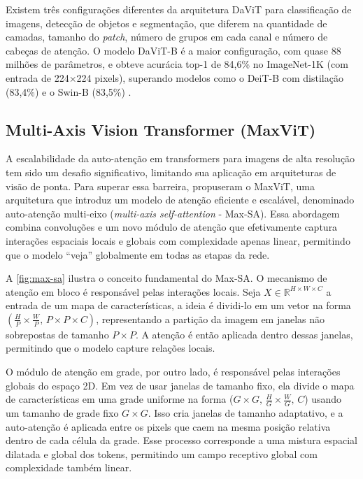 Existem três configurações diferentes da arquitetura DaViT para classificação de imagens, detecção de objetos e segmentação, que diferem na quantidade de camadas, tamanho do \textit{patch}, número de grupos em cada canal e número de cabeças de atenção. O modelo DaViT-B é a maior configuração, com quase 88 milhões de parâmetros, e obteve acurácia top-1 de 84,6\% no ImageNet-1K (com entrada de 224×224 pixels), superando modelos como o DeiT-B com distilação (83,4\%) e o Swin-B (83,5\%) \cite{Touvron2021, Liu2021}.

\subsection{Multi-Axis Vision Transformer (MaxViT)}

A escalabilidade da auto-atenção em transformers para imagens de alta resolução tem sido um desafio significativo, limitando sua aplicação em arquiteturas de visão de ponta. Para superar essa barreira,  propuseram o MaxViT, uma arquitetura que introduz um modelo de atenção eficiente e escalável, denominado auto-atenção multi-eixo (\textit{multi-axis self-attention} - Max-SA). Essa abordagem combina convoluções e um novo módulo de atenção que efetivamente captura interações espaciais locais e globais com complexidade apenas linear, permitindo que o modelo ``veja'' globalmente em todas as etapas da rede.

A \autoref{fig:max-sa} ilustra o conceito fundamental do Max-SA. O mecanismo de atenção em bloco é responsável pelas interações locais. Seja $X \in \mathbb{R}^{H \times W \times C}$ a entrada de um mapa de características, a ideia é dividi-lo em um vetor na forma $(\frac{H}{P} \times \frac{W}{P} \text{, } P \times P \times C)$, representando a partição da imagem em janelas não sobrepostas de tamanho $P \times P$. A atenção é então aplicada dentro dessas janelas, permitindo que o modelo capture relações locais.

O módulo de atenção em grade, por outro lado, é responsável pelas interações globais do espaço 2D. Em vez de usar janelas de tamanho fixo, ela divide o mapa de características em uma grade uniforme na forma ($G \times G \text{, } \frac{H}{G} \times \frac{W}{G} \text{, } C$) usando um tamanho de grade fixo $G \times G$. Isso cria janelas de tamanho adaptativo, e a auto-atenção é aplicada entre os pixels que caem na mesma posição relativa dentro de cada célula da grade. Esse processo corresponde a uma mistura espacial dilatada e global dos tokens, permitindo um campo receptivo global com complexidade também linear.

